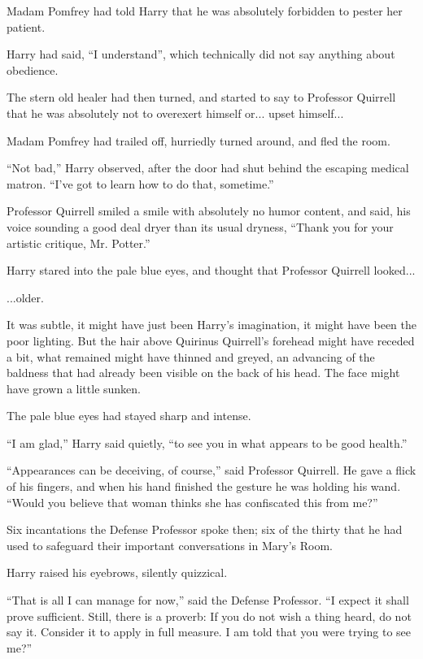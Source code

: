 Madam Pomfrey had told Harry that he was absolutely forbidden to pester
her patient.

Harry had said, ``I understand'', which technically did not say anything
about obedience.

The stern old healer had then turned, and started to say to Professor
Quirrell that he was absolutely not to overexert himself or...
upset himself...

Madam Pomfrey had trailed off, hurriedly turned around, and fled the
room.

``Not bad,'' Harry observed, after the door had shut behind the escaping
medical matron. ``I've got to learn how to do that, sometime.''

Professor Quirrell smiled a smile with absolutely no humor content, and
said, his voice sounding a good deal dryer than its usual dryness,
``Thank you for your artistic critique, Mr. Potter.''

Harry stared into the pale blue eyes, and thought that Professor
Quirrell looked...

...older.

It was subtle, it might have just been Harry's imagination, it might
have been the poor lighting. But the hair above Quirinus Quirrell's
forehead might have receded a bit, what remained might have thinned and
greyed, an advancing of the baldness that had already been visible on
the back of his head. The face might have grown a little sunken.

The pale blue eyes had stayed sharp and intense.

``I am glad,'' Harry said quietly, ``to see you in what appears to be
good health.''

``Appearances can be deceiving, of course,'' said Professor Quirrell. He
gave a flick of his fingers, and when his hand finished the gesture he
was holding his wand. ``Would you believe that woman thinks she has
confiscated this from me?''

Six incantations the Defense Professor spoke then; six of the thirty
that he had used to safeguard their important conversations in Mary's
Room.

Harry raised his eyebrows, silently quizzical.

``That is all I can manage for now,'' said the Defense Professor. ``I
expect it shall prove sufficient. Still, there is a proverb: If you do
not wish a thing heard, do not say it. Consider it to apply in full
measure. I am told that you were trying to see me?''

